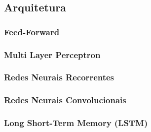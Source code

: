     \subsection{Arquitetura}
        \subsubsection{Feed-Forward}
        \subsubsection{Multi Layer Perceptron}
        \subsubsection{Redes Neurais Recorrentes}
        \subsubsection{Redes Neurais Convolucionais}
        \subsubsection{Long Short-Term Memory (LSTM)}
